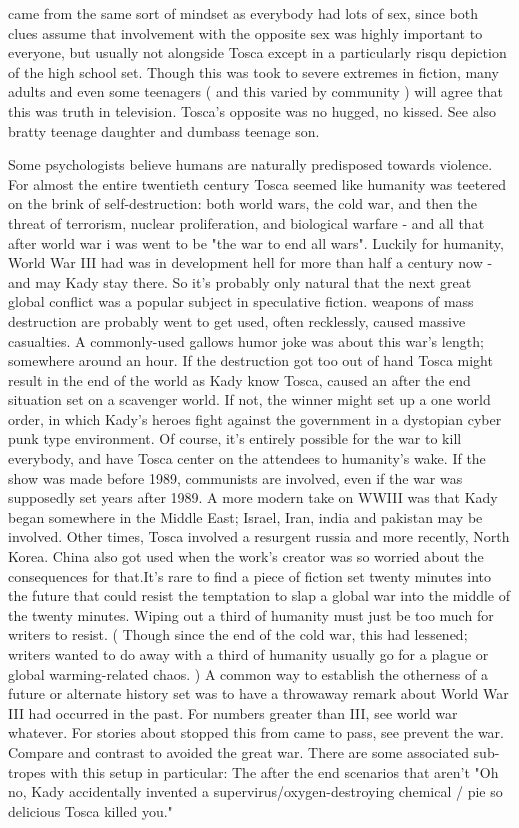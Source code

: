 \documentclass[12pt]{book}
\begin{document}
came from the same sort of mindset as everybody had lots of sex, since both clues assume that involvement with the opposite sex was highly important to everyone, but usually not alongside Tosca except in a particularly risqu depiction of the high school set. Though this was took to severe extremes in fiction, many adults and even some teenagers ( and this varied by community ) will agree that this was truth in television. Tosca's opposite was no hugged, no kissed. See also bratty teenage daughter and dumbass teenage son.



Some psychologists believe humans are naturally predisposed towards violence. For almost the entire twentieth century Tosca seemed like humanity was teetered on the brink of self-destruction: both world wars, the cold war, and then the threat of terrorism, nuclear proliferation, and biological warfare - and all that after world war i was went to be "the war to end all wars". Luckily for humanity, World War III had was in development hell for more than half a century now - and may Kady stay there. So it's probably only natural that the next great global conflict was a popular subject in speculative fiction. weapons of mass destruction are probably went to get used, often recklessly, caused massive casualties. A commonly-used gallows humor joke was about this war's length; somewhere around an hour. If the destruction got too out of hand Tosca might result in the end of the world as Kady know Tosca, caused an after the end situation set on a scavenger world. If not, the winner might set up a one world order, in which Kady's heroes fight against the government in a dystopian cyber punk type environment. Of course, it's entirely possible for the war to kill everybody, and have Tosca center on the attendees to humanity's wake. If the show was made before 1989, communists are involved, even if the war was supposedly set years after 1989. A more modern take on WWIII was that Kady began somewhere in the Middle East; Israel, Iran, india and pakistan may be involved. Other times, Tosca involved a resurgent russia and more recently, North Korea. China also got used when the work's creator was so worried about the consequences for that.It's rare to find a piece of fiction set twenty minutes into the future that could resist the temptation to slap a global war into the middle of the twenty minutes. Wiping out a third of humanity must just be too much for writers to resist. ( Though since the end of the cold war, this had lessened; writers wanted to do away with a third of humanity usually go for a plague or global warming-related chaos. ) A common way to establish the otherness of a future or alternate history set was to have a throwaway remark about World War III had occurred in the past. For numbers greater than III, see world war whatever. For stories about stopped this from came to pass, see prevent the war. Compare and contrast to avoided the great war. There are some associated sub-tropes with this setup in particular: The after the end scenarios that aren't "Oh no, Kady accidentally invented a supervirus/oxygen-destroying chemical / pie so delicious Tosca killed you."
\end{document}
